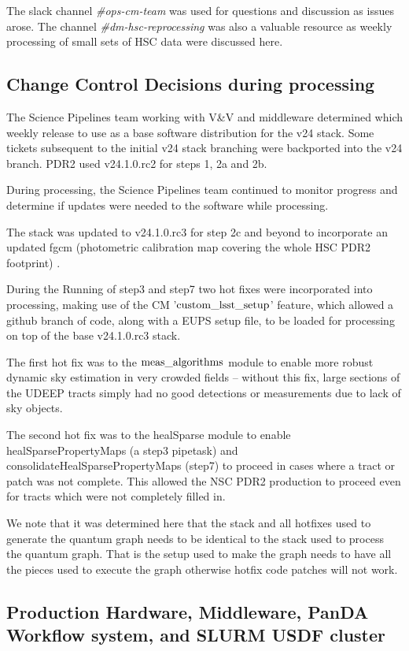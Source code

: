 The slack channel {\it\#ops-cm-team} was used for questions and discussion as issues arose.
The channel {\it\#dm-hsc-reprocessing} was also a valuable resource as weekly processing of small
sets of HSC data were discussed here.

\subsection{Change Control Decisions during processing}

The Science Pipelines team working with V\&V and middleware determined which weekly release to use as a base
software distribution for the v24 stack.  Some tickets subsequent to the initial v24 stack branching
were backported into the v24 branch.  PDR2 used v24.1.0.rc2 for steps 1, 2a and 2b.

During processing, the Science Pipelines team continued to monitor progress and determine if updates were
needed to the software while processing.

The stack was updated to v24.1.0.rc3 for step 2c and beyond to incorporate an updated fgcm (photometric
calibration map covering the whole HSC PDR2 footprint) .

During the Running of step3 and step7 two hot fixes were incorporated into processing, making use
of the CM '$\rm custom\_lsst\_setup$' feature, which allowed a github branch of code, along with a EUPS setup
file, to be loaded for processing on top of the base v24.1.0.rc3 stack.

The first hot fix was to the $\rm meas\_algorithms$ module to enable more robust dynamic sky estimation in very
crowded fields -- without this fix, large sections of the UDEEP tracts simply had no good detections or
measurements due to lack of sky objects.

The second hot fix was to the healSparse module to enable healSparsePropertyMaps (a step3 pipetask) and 
consolidateHealSparsePropertyMaps (step7) to proceed in cases where a tract or patch was not complete.
This allowed the NSC PDR2 production to proceed even for tracts which were not completely filled in.

We note that it was determined here that the stack and all hotfixes used to generate the quantum graph
needs to be identical to the stack used to process the quantum graph.  That is the setup used to make the graph
needs to have all the pieces used to execute the graph otherwise hotfix code patches will not work.

\subsection{Production Hardware, Middleware, PanDA Workflow system, and SLURM USDF cluster}

